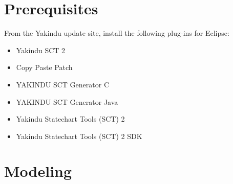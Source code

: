 \documentclass[]{report}
\begin{document}
\section{Prerequisites}

From the Yakindu update site, install the following plug-ins for
Eclipse:

\begin{itemize}
\itemsep1pt\parskip0pt
\item
  Yakindu SCT 2
\item
  Copy Paste Patch
\item
  YAKINDU SCT Generator C
\item
  YAKINDU SCT Generator Java
\item
  Yakindu Statechart Tools (SCT) 2
\item
  Yakindu Statechart Tools (SCT) 2 SDK
\end{itemize}

\section{Modeling}
\end{document}
